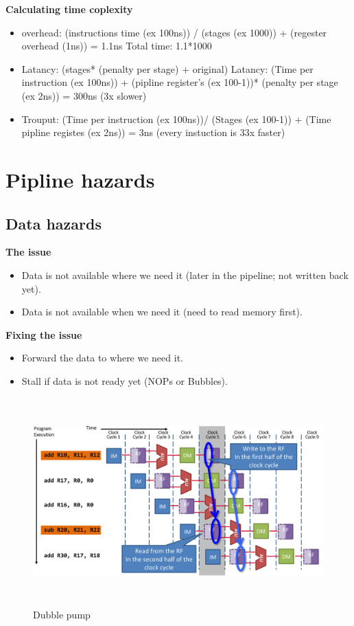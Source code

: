 \textbf{Calculating time coplexity}
\begin{itemize}
\item  overhead: (instructions time (ex 100ns)) / (stages (ex 1000)) + (regester overhead (1ns)) = 1.1ns \newline
    Total time: 1.1*1000
\item  Latancy: (stages* (penalty per stage) + original) \newline
  Latancy: (Time per instruction (ex 100ns)) + (pipline register's (ex 100-1))* (penalty per stage (ex 2ns)) = 300ns (3x slower)
\item  Trouput: (Time per instruction (ex 100ns))/ (Stages (ex 100-1)) + (Time pipline registes (ex 2ns)) = 3ns (every instuction is 33x faster) 
\end{itemize}


\newpage


\section{Pipline hazards}

\subsection{Data hazards}
\textbf{The issue}
\begin{itemize}
\item  Data is not available where we need it (later in the pipeline; not written back yet).
\item  Data is not available when we need it (need to read memory first).
\end{itemize}

\textbf{Fixing the issue}
\begin{itemize}
\item  Forward the data to where we need it.
\item  Stall if data is not ready yet (NOPs or Bubbles).
\end{itemize}

\begin{figure}[h]
    \vspace{10mm}
    \centering
    \includegraphics[width=16cm, height=8cm]{image/dubble-pump.png} 
    \caption{Dubble pump}
\end{figure}


